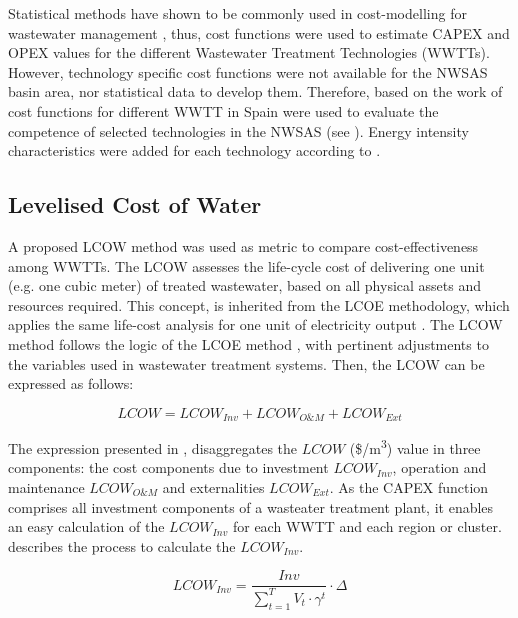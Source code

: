 Statistical methods have shown to be commonly used in cost-modelling for wastewater management \cite{Costmodellingwastewater2011,Assessmentwastewatertreatment2012,Economicfeasibility2012}, thus, cost functions were used to estimate CAPEX and OPEX values for the different Wastewater Treatment Technologies (WWTTs). However, technology specific cost functions were not available for the NWSAS basin area, nor statistical data to develop them. Therefore, based on the work of \citet{Assessmentwastewatertreatment2012} cost functions for different WWTT in Spain were used to evaluate the competence of selected technologies in the NWSAS (see ). Energy intensity characteristics were added for each technology according to \cite{Energypatternanalysis2012,ComparativeAnalysisEnergy2017}.

% 

\subsection{Levelised Cost of Water}
A proposed LCOW method was used as metric to compare cost-effectiveness among WWTTs. The LCOW assesses the life-cycle cost of delivering one unit (e.g. one cubic meter) of treated wastewater, based on all physical assets and resources required. This concept, is inherited from the LCOE methodology, which applies the same life-cost analysis for one unit of electricity output \cite{prospectscostcompetitive2013}. The LCOW method follows the logic of the LCOE method \cite{prospectscostcompetitive2013,GeospatialLevelizedCost2015}, with pertinent adjustments to the variables used in wastewater treatment systems. Then, the LCOW can be expressed as follows:

\begin{equation}\label{eq:lcow}
LCOW = LCOW_{Inv} + LCOW_{O\&M} + LCOW_{Ext}
\end{equation}

The expression presented in , disaggregates the $LCOW$ (\$/m\textsuperscript{3}) value in three components: the cost components due to investment $LCOW_{Inv}$, operation and maintenance $LCOW_{O\&M}$ and externalities $LCOW_{Ext}$. As the CAPEX function comprises all investment components of a wasteater treatment plant, it enables an easy calculation of the $LCOW_{Inv}$ for each WWTT and each region or cluster.  describes the process to calculate the $LCOW_{Inv}$.

\begin{equation}\label{eq:lcow_inv}
LCOW_{Inv} = \frac{Inv}{\sum_{t=1}^{T} V_{t}\cdot\gamma^{t}}\cdot\Delta
\end{equation}

